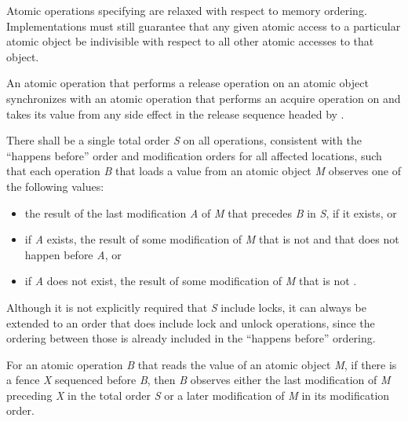 \begin{note} Atomic operations specifying  are relaxed
with respect to memory ordering. Implementations must still guarantee that any
given atomic access to a particular atomic object be indivisible with respect
to all other atomic accesses to that object. \end{note}

\pnum
An atomic operation  that performs a release operation on an atomic
object  synchronizes with an atomic operation  that performs
an acquire operation on  and takes its value from any side effect in the
release sequence headed by .

\pnum
There shall be a single total order \textit{S} on all 
operations, consistent with the ``happens before'' order and modification orders for all
affected locations, such that each  operation
\textit{B} that loads a
value from an atomic object \textit{M}
observes one of the following values:

\begin{itemize}
\item the result of the last modification \textit{A} of \textit{M} that precedes
\textit{B} in \textit{S}, if it exists, or

\item if \textit{A} exists, the result of some modification of \textit{M}
that is not
 and that does not happen before \textit{A}, or

\item if \textit{A} does not exist, the result of some modification of \textit{M}
that is not
.
\end{itemize}

\begin{note} Although it is not explicitly required that \textit{S} include locks, it can
always be extended to an order that does include lock and unlock operations, since the
ordering between those is already included in the ``happens before'' ordering. \end{note}

\pnum
For an atomic operation \textit{B} that reads the value of an atomic object \textit{M},
if there is a  fence \textit{X} sequenced before \textit{B},
then \textit{B} observes either the last  modification of
\textit{M} preceding \textit{X} in the total order \textit{S} or a later modification of
\textit{M} in its modification order.

